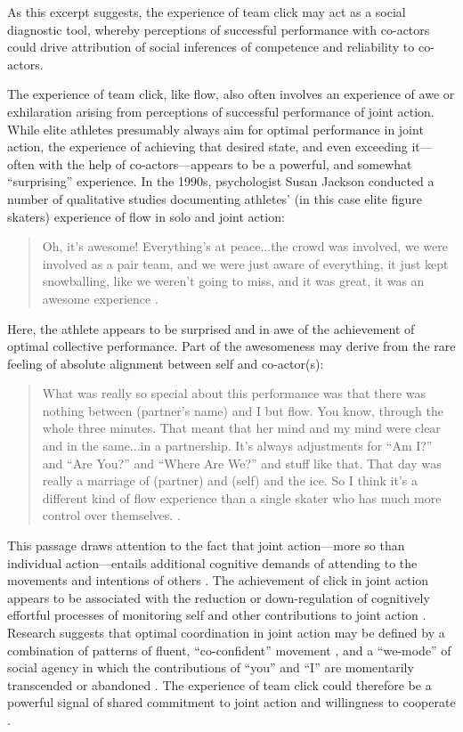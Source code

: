\begin{CJK}{UTF8}{gbsn}
As this excerpt suggests, the experience of team click may act as a social diagnostic tool, whereby perceptions of successful performance with co-actors could drive attribution of social inferences of competence and reliability to co-actors.

The experience of team click, like flow, also often involves an experience of awe or exhilaration arising from perceptions of successful performance of joint action.  While elite athletes presumably always aim for optimal performance in joint action, the experience of achieving that desired state, and even exceeding it---often with the help of co-actors---appears to be a powerful, and somewhat ``surprising'' experience.  In the 1990s, psychologist Susan Jackson conducted a number of qualitative studies documenting athletes' (in this case elite figure skaters) experience of flow in solo and joint action:

    \begin{quote}
      Oh, it's awesome! Everything's at peace...the crowd was involved, we were involved as a pair team, and we were just aware of everything, it just kept snowballing, like we weren't going to miss, and it was great, it was an awesome experience \citep[168]{Jackson1992}.
    \end{quote}

Here, the athlete appears to be surprised and in awe of the achievement of optimal collective performance.  Part of the awesomeness may derive from the rare feeling of absolute alignment between self and co-actor(s):

    \begin{quote}
      What was really so special about this performance was that there was nothing between (partner's name) and I but flow.  You know, through the whole three minutes.  That meant that her mind and my mind were clear and in the same...in a partnership. It's always adjustments for ``Am I?'' and ``Are You?'' and ``Where Are We?'' and stuff like that.  That day was really a marriage of (partner) and (self) and the ice.  So I think it's a different kind of flow experience than a single skater who has much more control over themselves. \citep[173-4]{Jackson1992}.
    \end{quote}

This passage draws attention to the fact that joint action---more so than individual action---entails additional cognitive demands of attending to the movements and intentions of others \citep{Vesper2010}.  The achievement of click in joint action appears to be associated with the reduction or down-regulation of cognitively effortful processes of monitoring self and other contributions to joint action \citep{Dietrich2004b}. Research suggests that optimal coordination in joint action may be defined by a combination of patterns of fluent, ``co-confident'' movement \citep[in place of effortful monitoring; see]{Noy2015,Noy2017}, and a ``we-mode'' of social agency in which the contributions of ``you'' and ``I'' are momentarily transcended or abandoned \citep[see][]{Gallotti2013}.
The experience of team click could therefore be a powerful signal of shared commitment to joint action and willingness to cooperate \citep{Reddish2013a}. \\


\end{CJK}
